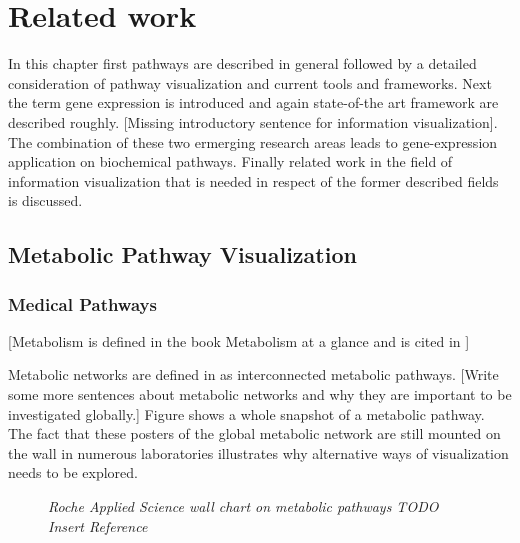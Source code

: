 \chapter{Related work}

In this chapter first pathways are described in general followed by a detailed consideration of pathway visualization and current tools and frameworks. Next the term gene expression is introduced and again state-of-the art framework are described roughly. [Missing introductory sentence for information visualization]. The combination of these two ermerging research areas leads to gene-expression application on biochemical pathways. Finally related work in the field of information visualization that is needed in respect of the former described fields is discussed.

\section{Metabolic Pathway Visualization}

\subsection{Medical Pathways}

[Metabolism is defined in the book Metabolism at a glance and is cited in \cite{Bourqui2006}]

Metabolic networks are defined in \cite{Bourqui2006} as interconnected metabolic pathways.
[Write some more sentences about metabolic networks and why they are important to be investigated globally.]
Figure  shows a whole snapshot of a metabolic pathway. The fact that these posters of the global metabolic network are still mounted on the wall in numerous laboratories illustrates why alternative ways of visualization needs to be explored. 

\begin{figure}[ht]
\centering
{} 
\caption[Roche Applied Science wall chart on metabolic pathways]{\textit{Roche Applied Science wall chart on metabolic pathways TODO Insert Reference}} 
\label{gfx:RocheAppliedScience_MetabolicPathways_WallChart}
\end{figure}

